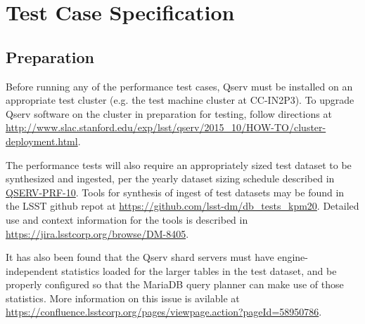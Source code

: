 \newpage
\section{Test Case Specification}

\subsection{Preparation}
\label{sec:prep}

Before running any of the performance test cases, Qserv must be installed on an appropriate test cluster (e.g. 
the test machine cluster at CC-IN2P3).  To upgrade Qserv software on the cluster in preparation for testing,
follow directions at \url{http://www.slac.stanford.edu/exp/lsst/qserv/2015_10/HOW-TO/cluster-deployment.html}.

The performance tests will also require an appropriately sized test dataset to be synthesized and ingested,
per the yearly dataset sizing schedule described in \hyperref[qserv-prf-10]{\textsc{QSERV-PRF-10}}.  Tools
for synthesis of ingest of test datasets may be found in the LSST github repot at \url{https://github.com/lsst-dm/db_tests_kpm20}.  Detailed use and context information for the tools is described in \url{https://jira.lsstcorp.org/browse/DM-8405}.

It has also been found that the Qserv shard servers must have engine-independent statistics
loaded for the larger tables in the test dataset, and be properly
configured so that the MariaDB query planner can make use of those statistics.  More information on this
issue is avilable at \url{https://confluence.lsstcorp.org/pages/viewpage.action?pageId=58950786}.

\newpage

\newpage

\newpage

\newpage

\newpage

\newpage

\newpage

\newpage

